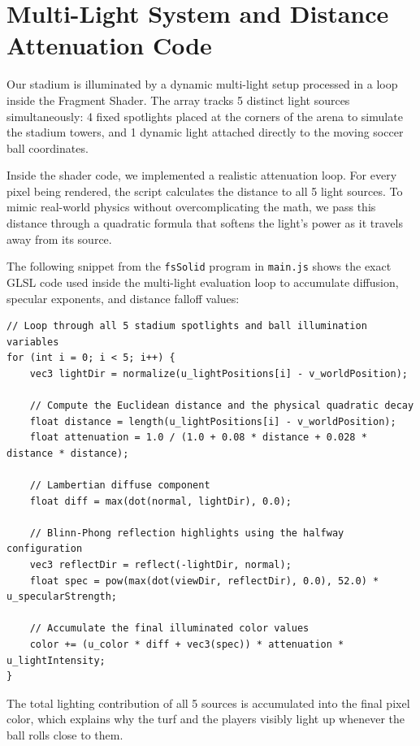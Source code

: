 \section{Multi-Light System and Distance Attenuation Code}
Our stadium is illuminated by a dynamic multi-light setup processed in a loop inside the Fragment Shader. The array tracks 5 distinct light sources simultaneously: 4 fixed spotlights placed at the corners of the arena to simulate the stadium towers, and 1 dynamic light attached directly to the moving soccer ball coordinates.

Inside the shader code, we implemented a realistic attenuation loop. For every pixel being rendered, the script calculates the distance to all 5 light sources. To mimic real-world physics without overcomplicating the math, we pass this distance through a quadratic formula that softens the light's power as it travels away from its source. 

The following snippet from the \texttt{fsSolid} program in \texttt{main.js} shows the exact GLSL code used inside the multi-light evaluation loop to accumulate diffusion, specular exponents, and distance falloff values:

\begin{lstlisting}[style=vscode_JS]
// Loop through all 5 stadium spotlights and ball illumination variables
for (int i = 0; i < 5; i++) {
    vec3 lightDir = normalize(u_lightPositions[i] - v_worldPosition);

    // Compute the Euclidean distance and the physical quadratic decay
    float distance = length(u_lightPositions[i] - v_worldPosition);
    float attenuation = 1.0 / (1.0 + 0.08 * distance + 0.028 * distance * distance);
    
    // Lambertian diffuse component
    float diff = max(dot(normal, lightDir), 0.0);

    // Blinn-Phong reflection highlights using the halfway configuration
    vec3 reflectDir = reflect(-lightDir, normal);
    float spec = pow(max(dot(viewDir, reflectDir), 0.0), 52.0) * u_specularStrength;
    
    // Accumulate the final illuminated color values
    color += (u_color * diff + vec3(spec)) * attenuation * u_lightIntensity;
}
\end{lstlisting}

The total lighting contribution of all 5 sources is accumulated into the final pixel color, which explains why the turf and the players visibly light up whenever the ball rolls close to them.

